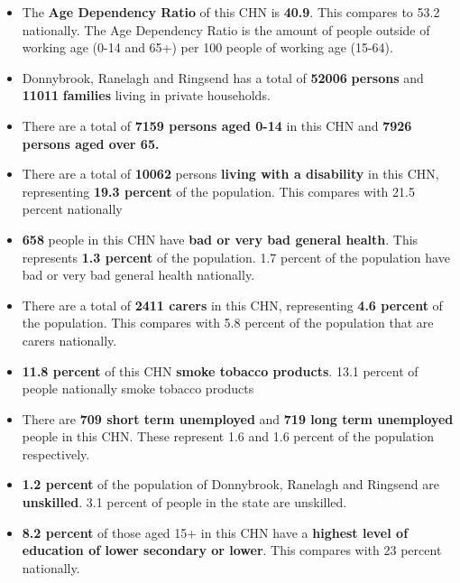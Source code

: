 \documentclass{article}
\begin{document}
\begin{itemize}

\item The \textbf{Age Dependency Ratio} of this CHN is  \textbf{40.9}. This compares to 53.2 nationally. The Age Dependency Ratio is the amount of people outside of working age (0-14 and 65+) per 100 people of working age (15-64). 

\item Donnybrook, Ranelagh and Ringsend has a total of \textbf{\num{52006}} \textbf{persons} and  \textbf{\num{11011}} \textbf{families} living in private households.

\item There are a total of \textbf{\num{7159} persons aged 0-14} in this CHN and \textbf{\num{7926} persons aged over 65.} 

\item There are a total of \textbf{\num{10062}} persons \textbf{living with a disability} in this CHN, representing \textbf{19.3 percent} of the population. This compares with  21.5 percent nationally

\item \textbf{\num{658}} people in this CHN have \textbf{bad or very bad general health}. This represents \textbf{1.3 percent} of the population. 1.7 percent of the population have bad or very bad general health nationally. 

\item There are a total of \textbf{\num{2411} carers} in this CHN, representing \textbf{4.6 percent} of the population. This compares with 5.8 percent of the population that are carers nationally. 

\item \textbf{11.8 percent} of this CHN \textbf{smoke tobacco products}. 13.1 percent of people nationally smoke tobacco products

\item There are \textbf{\num{709} short term unemployed} and \textbf{\num{719} long term unemployed} people in this CHN. These represent 1.6 and 1.6 percent of the population respectively.

\item  \textbf{1.2 percent} of the population of Donnybrook, Ranelagh and Ringsend are \textbf{unskilled}. 3.1 percent of people in the state are unskilled.

\item \textbf{8.2 percent} of those aged 15+ in this CHN have a \textbf{highest level of education of lower secondary or lower}. This compares with 23 percent nationally. 


\end{itemize}
\end{document}
